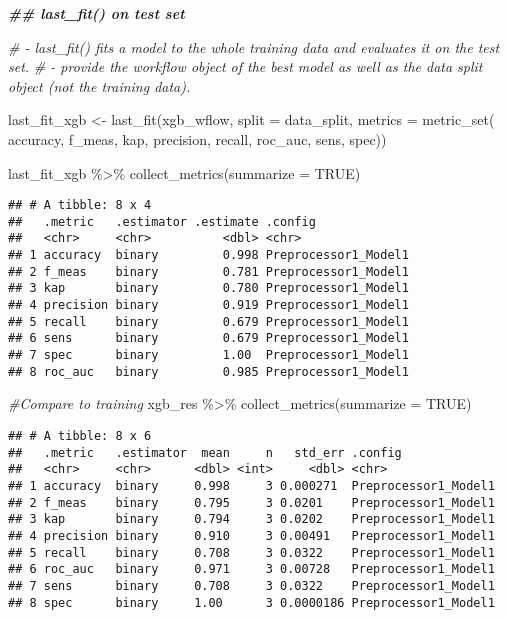 \documentclass[
]{article}
\newenvironment{Shaded}{\begin{snugshade}}{\end{snugshade}}
\newcommand{\AttributeTok}[1]{\textcolor[rgb]{0.77,0.63,0.00}{#1}}
\newcommand{\CommentTok}[1]{\textcolor[rgb]{0.56,0.35,0.01}{\textit{#1}}}
\newcommand{\ConstantTok}[1]{\textcolor[rgb]{0.00,0.00,0.00}{#1}}
\newcommand{\DocumentationTok}[1]{\textcolor[rgb]{0.56,0.35,0.01}{\textbf{\textit{#1}}}}
\newcommand{\FunctionTok}[1]{\textcolor[rgb]{0.00,0.00,0.00}{#1}}
\newcommand{\NormalTok}[1]{#1}
\newcommand{\OtherTok}[1]{\textcolor[rgb]{0.56,0.35,0.01}{#1}}
\newcommand{\SpecialCharTok}[1]{\textcolor[rgb]{0.00,0.00,0.00}{#1}}
\begin{document}
\begin{Shaded}
\begin{Highlighting}[]
\DocumentationTok{\#\# \textasciigrave{}last\_fit()\textasciigrave{} on test set}

\CommentTok{\# {-} \textasciigrave{}last\_fit()\textasciigrave{}  fits a model to the whole training data and evaluates it on the test set. }
\CommentTok{\# {-} provide the workflow object of the best model as well as the data split object (not the training data). }
 
\NormalTok{last\_fit\_xgb }\OtherTok{\textless{}{-}} \FunctionTok{last\_fit}\NormalTok{(xgb\_wflow, }
                        \AttributeTok{split =}\NormalTok{ data\_split,}
                        \AttributeTok{metrics =} \FunctionTok{metric\_set}\NormalTok{(}
\NormalTok{                          accuracy, f\_meas, kap, precision,}
\NormalTok{                          recall, roc\_auc, sens, spec))}

\NormalTok{last\_fit\_xgb }\SpecialCharTok{\%\textgreater{}\%} \FunctionTok{collect\_metrics}\NormalTok{(}\AttributeTok{summarize =} \ConstantTok{TRUE}\NormalTok{)}
\end{Highlighting}
\end{Shaded}

\begin{verbatim}
## # A tibble: 8 x 4
##   .metric   .estimator .estimate .config             
##   <chr>     <chr>          <dbl> <chr>               
## 1 accuracy  binary         0.998 Preprocessor1_Model1
## 2 f_meas    binary         0.781 Preprocessor1_Model1
## 3 kap       binary         0.780 Preprocessor1_Model1
## 4 precision binary         0.919 Preprocessor1_Model1
## 5 recall    binary         0.679 Preprocessor1_Model1
## 6 sens      binary         0.679 Preprocessor1_Model1
## 7 spec      binary         1.00  Preprocessor1_Model1
## 8 roc_auc   binary         0.985 Preprocessor1_Model1
\end{verbatim}

\begin{Shaded}
\begin{Highlighting}[]
\CommentTok{\#Compare to training}
\NormalTok{xgb\_res }\SpecialCharTok{\%\textgreater{}\%} \FunctionTok{collect\_metrics}\NormalTok{(}\AttributeTok{summarize =} \ConstantTok{TRUE}\NormalTok{)}
\end{Highlighting}
\end{Shaded}

\begin{verbatim}
## # A tibble: 8 x 6
##   .metric   .estimator  mean     n   std_err .config             
##   <chr>     <chr>      <dbl> <int>     <dbl> <chr>               
## 1 accuracy  binary     0.998     3 0.000271  Preprocessor1_Model1
## 2 f_meas    binary     0.795     3 0.0201    Preprocessor1_Model1
## 3 kap       binary     0.794     3 0.0202    Preprocessor1_Model1
## 4 precision binary     0.910     3 0.00491   Preprocessor1_Model1
## 5 recall    binary     0.708     3 0.0322    Preprocessor1_Model1
## 6 roc_auc   binary     0.971     3 0.00728   Preprocessor1_Model1
## 7 sens      binary     0.708     3 0.0322    Preprocessor1_Model1
## 8 spec      binary     1.00      3 0.0000186 Preprocessor1_Model1
\end{verbatim}
\end{document}
